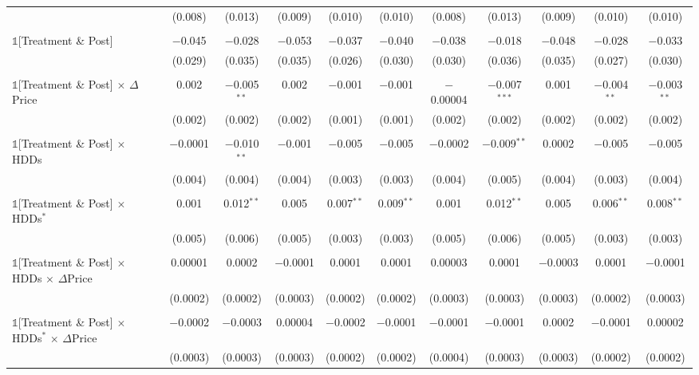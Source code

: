 \begin{table}[!htbp]
\begin{longtable}{@{\extracolsep{0pt}}lcccccccccc}
  & (0.008) & (0.013) & (0.009) & (0.010) & (0.010) & (0.008) & (0.013) & (0.009) & (0.010) & (0.010) \\ 
  & & & & & & & & & & \\ 
 $\mathbb{1}$[Treatment \& Post] & $-$0.045 & $-$0.028 & $-$0.053 & $-$0.037 & $-$0.040 & $-$0.038 & $-$0.018 & $-$0.048 & $-$0.028 & $-$0.033 \\ 
  & (0.029) & (0.035) & (0.035) & (0.026) & (0.030) & (0.030) & (0.036) & (0.035) & (0.027) & (0.030) \\ 
  & & & & & & & & & & \\ 
 $\mathbb{1}$[Treatment \& Post] $\times$ $\Delta$Price & 0.002 & $-$0.005$^{**}$ & 0.002 & $-$0.001 & $-$0.001 & $-$0.00004 & $-$0.007$^{***}$ & 0.001 & $-$0.004$^{**}$ & $-$0.003$^{**}$ \\ 
  & (0.002) & (0.002) & (0.002) & (0.001) & (0.001) & (0.002) & (0.002) & (0.002) & (0.002) & (0.002) \\ 
  & & & & & & & & & & \\ 
 $\mathbb{1}$[Treatment \& Post] $\times$ HDDs & $-$0.0001 & $-$0.010$^{**}$ & $-$0.001 & $-$0.005 & $-$0.005 & $-$0.0002 & $-$0.009$^{**}$ & 0.0002 & $-$0.005 & $-$0.005 \\ 
  & (0.004) & (0.004) & (0.004) & (0.003) & (0.003) & (0.004) & (0.005) & (0.004) & (0.003) & (0.004) \\ 
  & & & & & & & & & & \\ 
 $\mathbb{1}$[Treatment \& Post] $\times$ HDDs$^{*}$ & 0.001 & 0.012$^{**}$ & 0.005 & 0.007$^{**}$ & 0.009$^{**}$ & 0.001 & 0.012$^{**}$ & 0.005 & 0.006$^{**}$ & 0.008$^{**}$ \\ 
  & (0.005) & (0.006) & (0.005) & (0.003) & (0.003) & (0.005) & (0.006) & (0.005) & (0.003) & (0.003) \\ 
  & & & & & & & & & & \\ 
 $\mathbb{1}$[Treatment \& Post] $\times$ HDDs $\times$ $\Delta$Price & 0.00001 & 0.0002 & $-$0.0001 & 0.0001 & 0.0001 & 0.00003 & 0.0001 & $-$0.0003 & 0.0001 & $-$0.0001 \\ 
  & (0.0002) & (0.0002) & (0.0003) & (0.0002) & (0.0002) & (0.0003) & (0.0003) & (0.0003) & (0.0002) & (0.0003) \\ 
  & & & & & & & & & & \\ 
 $\mathbb{1}$[Treatment \& Post] $\times$ HDDs$^{*}$ $\times$ $\Delta$Price & $-$0.0002 & $-$0.0003 & 0.00004 & $-$0.0002 & $-$0.0001 & $-$0.0001 & $-$0.0001 & 0.0002 & $-$0.0001 & 0.00002 \\ 
  & (0.0003) & (0.0003) & (0.0003) & (0.0002) & (0.0002) & (0.0004) & (0.0003) & (0.0003) & (0.0002) & (0.0002) \\ 

\end{longtable}
\end{table}
